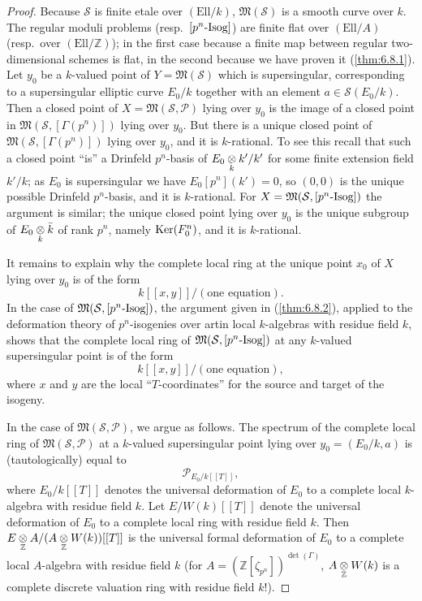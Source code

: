 \begin{proof}
Because $\mathcal{S}$ is finite etale over $(\mathrm{Ell}/k)$, $\mathfrak{M}(\mathcal{S})$ is a smooth curve over $k$. The regular moduli problems (resp.~$[p^n\text{-\rm Isog}]$) are finite flat over $(\mathrm{Ell}/A)$ (resp.~over $(\mathrm{Ell}/\mathbb{Z})$); in the first case because a finite map between regular two-dimensional schemes is flat, in the second because we have proven it (\ref{thm:6.8.1}). Let $y_0$ be a $k$-valued point of $Y = \mathfrak{M}(\mathcal{S})$ which is supersingular, corresponding to a supersingular elliptic curve $E_0/k$ together with an element $a \in \mathcal{S}(E_0/k)$. Then a closed point of $X = \mathfrak{M}(\mathcal{S}, \mathcal{P})$ lying over $y_0$ is the image of a closed point in $\mathfrak{M}(\mathcal{S}, [\Gamma(p^n)])$ lying over $y_0$. But there is a unique closed point of $\mathfrak{M}(\mathcal{S}, [\Gamma(p^n)])$ lying over $y_0$, and it is $k$-rational. To see this recall that such a closed point ``is'' a Drinfeld $p^n$-basis of $E_0 \underset{k}{\otimes} k'/k'$ for some finite extension field $k'/k$; as $E_0$ is supersingular we have $E_0[p^n](k') = 0$, so $(0, 0)$ is the unique possible Drinfeld $p^n$-basis, and it is $k$-rational. For $X = \mathfrak{M}(\mathcal{S}, [p^n\text{-\rm Isog}])$ the argument is similar; the unique closed point lying over $y_0$ is the unique subgroup of $E_0 \underset{k}{\otimes} \bar{k}$ of rank $p^n$, namely $\operatorname{Ker}(F_0^n)$, and it is $k$-rational.

It remains to explain why the complete local ring at the unique point $x_0$ of $X$ lying over $y_0$ is of the form
\[
k[[x, y]]/(\text{one equation}) .
\]
In the case of $\mathfrak{M}(\mathcal{S}, [p^n\text{-\rm Isog}])$, the argument given in (\ref{thm:6.8.2}), applied to the deformation theory of $p^n$-isogenies over artin local $k$-algebras with residue field $k$, shows that the complete local ring of $\mathfrak{M}(\mathcal{S}, [p^n\text{-\rm Isog}])$ at any $k$-valued supersingular point is of the form
\[
k[[x, y]]/(\text{one equation}) ,
\]
where $x$ and $y$ are the local ``$T$-coordinates'' for the source and target of the isogeny.

In the case of $\mathfrak{M}(\mathcal{S}, \mathcal{P})$, we argue as follows. The spectrum of the complete local ring of $\mathfrak{M}(\mathcal{S}, \mathcal{P})$ at a $k$-valued supersingular point lying over $y_0 = (E_0/k, a)$ is (tautologically) equal to
\[
\mathcal{P}_{E_0/k[[T]]} ,
\]
where $E_0/k[[T]]$ denotes the universal deformation of $E_0$ to a complete local $k$-algebra with residue field $k$. Let $E/W(k)[[T]]$ denote the universal deformation of $E_0$ to a complete local ring with residue field $k$. Then $E \underset{\mathbb{Z}}{\otimes} A / (A \underset{\mathbb{Z}}{\otimes} W(k))[[T]]$ is the universal formal deformation of $E_0$ to a complete local $A$-algebra with residue field $k$ (for $A = (\mathbb{Z}[\zeta_{p^n}])^{\det(\Gamma)}$, $A \underset{\mathbb{Z}}{\otimes} W(k)$ is a complete discrete valuation ring with residue field $k$!).


\end{proof}
